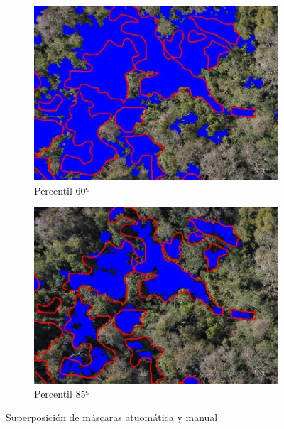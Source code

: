 \begin{figure}
     \centering
     \begin{subfigure}[b]{0.5\textwidth}
         \centering
         \includegraphics[width=\textwidth]{Imagenes/superposition of masks.png}
         \caption{Percentil 60º}
         \label{p60}
     \end{subfigure}
     \hfill
     
     \begin{subfigure}[b]{0.5\textwidth}
         \centering
         \includegraphics[width=\textwidth]{Imagenes/superposition of masks 2.png}
         \caption{Percentil 85º}
         \label{p85}
     \end{subfigure}
        \caption{Superposición de máscaras atuomática y manual}
        \label{superposicion}
\end{figure}

